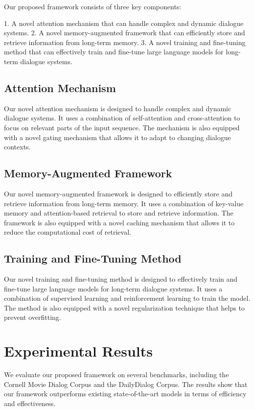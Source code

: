 \documentclass{article}
\begin{document}
Our proposed framework consists of three key components:

1.  A novel attention mechanism that can handle complex and dynamic dialogue systems.
2.  A novel memory-augmented framework that can efficiently store and retrieve information from long-term memory.
3.  A novel training and fine-tuning method that can effectively train and fine-tune large language models for long-term dialogue systems.

\subsection{Attention Mechanism}

Our novel attention mechanism is designed to handle complex and dynamic dialogue systems. It uses a combination of self-attention and cross-attention to focus on relevant parts of the input sequence. The mechanism is also equipped with a novel gating mechanism that allows it to adapt to changing dialogue contexts.

\subsection{Memory-Augmented Framework}

Our novel memory-augmented framework is designed to efficiently store and retrieve information from long-term memory. It uses a combination of key-value memory and attention-based retrieval to store and retrieve information. The framework is also equipped with a novel caching mechanism that allows it to reduce the computational cost of retrieval.

\subsection{Training and Fine-Tuning Method}

Our novel training and fine-tuning method is designed to effectively train and fine-tune large language models for long-term dialogue systems. It uses a combination of supervised learning and reinforcement learning to train the model. The method is also equipped with a novel regularization technique that helps to prevent overfitting.

\section{Experimental Results}

We evaluate our proposed framework on several benchmarks, including the Cornell Movie Dialog Corpus and the DailyDialog Corpus. The results show that our framework outperforms existing state-of-the-art models in terms of efficiency and effectiveness.
\end{document}
